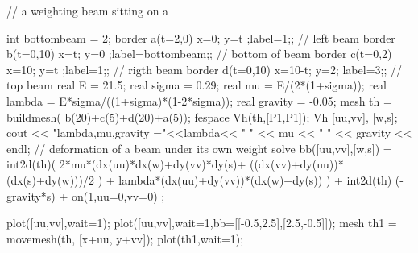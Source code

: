 \documentclass[twoside]{book}
\begin{document}
//   a weighting beam sitting on a

int bottombeam = 2;
border a(t=2,0)  { x=0; y=t ;label=1;};        //  left beam
border b(t=0,10) { x=t; y=0 ;label=bottombeam;};        //  bottom of beam
border c(t=0,2)  { x=10; y=t ;label=1;};       //  rigth beam
border d(t=0,10) { x=10-t; y=2; label=3;};     //  top beam 
real E = 21.5;
real sigma = 0.29;
real mu = E/(2*(1+sigma));
real lambda = E*sigma/((1+sigma)*(1-2*sigma));
real gravity = -0.05;
mesh th = buildmesh( b(20)+c(5)+d(20)+a(5));
fespace Vh(th,[P1,P1]);
Vh [uu,vv], [w,s];
cout << "lambda,mu,gravity ="<<lambda<< " " << mu << " " << gravity << endl;
// deformation of a beam under its own weight 
solve  bb([uu,vv],[w,s])  = 
    int2d(th)(
                2*mu*(dx(uu)*dx(w)+dy(vv)*dy(s)+ ((dx(vv)+dy(uu))*(dx(s)+dy(w)))/2 )
               + lambda*(dx(uu)+dy(vv))*(dx(w)+dy(s))
             ) 
  + int2d(th) (-gravity*s)
  + on(1,uu=0,vv=0)
 ;


plot([uu,vv],wait=1);
plot([uu,vv],wait=1,bb=[[-0.5,2.5],[2.5,-0.5]]); 
mesh th1 = movemesh(th, [x+uu, y+vv]);
plot(th1,wait=1);
\eFF
\end{document}
